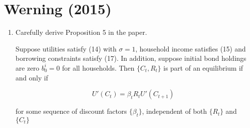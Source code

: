 \documentclass{article}
\newenvironment{manualtheorem}[1]{%
  \renewcommand\themanualtheoreminner{#1}%
  \manualtheoreminner
}{\endmanualtheoreminner}
\begin{document}
\pagebreak

\section{Werning (2015)}

\begin{enumerate}

\item Carefully derive Proposition 5 in the paper.

\begin{manualtheorem}{5} 
Suppose utilities satisfy (14) with $\sigma = 1$, household income satisfies (15) and borrowing constraints satisfy (17). In addition, suppose initial bond holdings are zero $b^i_0 = 0$ for
all households. Then $\{C_t, R_t\}$ is part of an equilibrium if and only if

$$
U'(C_t) = \beta_t R_t U'(C_{t+1})
$$

for some sequence of discount factors $\{\beta_t\}$, independent of both $\{R_t\}$ and $\{C_t\}$

\end{manualtheorem}




\end{enumerate}
\end{document}
